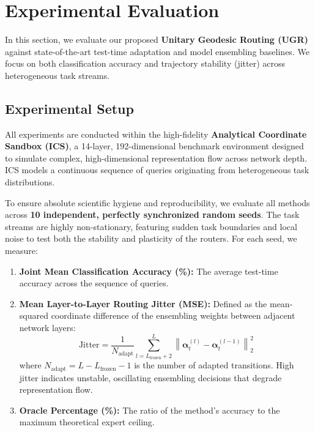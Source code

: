 \section{Experimental Evaluation}
\label{sec:experiments}

In this section, we evaluate our proposed \textbf{Unitary Geodesic Routing (UGR)} against state-of-the-art test-time adaptation and model ensembling baselines. We focus on both classification accuracy and trajectory stability (jitter) across heterogeneous task streams.

\subsection{Experimental Setup}
\label{subsec:setup}
All experiments are conducted within the high-fidelity \textbf{Analytical Coordinate Sandbox (ICS)}, a 14-layer, 192-dimensional benchmark environment designed to simulate complex, high-dimensional representation flow across network depth. ICS models a continuous sequence of queries originating from heterogeneous task distributions. 

To ensure absolute scientific hygiene and reproducibility, we evaluate all methods across \textbf{10 independent, perfectly synchronized random seeds}. The task streams are highly non-stationary, featuring sudden task boundaries and local noise to test both the stability and plasticity of the routers. For each seed, we measure:
\begin{enumerate}
    \item \textbf{Joint Mean Classification Accuracy (\%):} The average test-time accuracy across the sequence of queries.
    \item \textbf{Mean Layer-to-Layer Routing Jitter (MSE):} Defined as the mean-squared coordinate difference of the ensembling weights between adjacent network layers:
    \begin{equation}
    \text{Jitter} = \frac{1}{N_{\text{adapt}}} \sum_{l=L_{\text{frozen}}+2}^L \left\| \boldsymbol{\alpha}_t^{(l)} - \boldsymbol{\alpha}_t^{(l-1)} \right\|_2^2
    \end{equation}
    where $N_{\text{adapt}} = L - L_{\text{frozen}} - 1$ is the number of adapted transitions.
    High jitter indicates unstable, oscillating ensembling decisions that degrade representation flow.
    \item \textbf{Oracle Percentage (\%):} The ratio of the method's accuracy to the maximum theoretical expert ceiling.
\end{enumerate}

